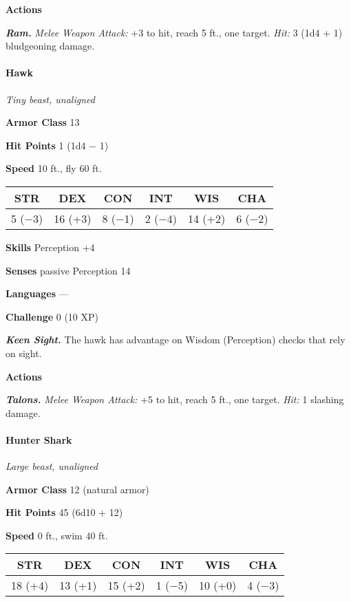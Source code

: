 \documentclass[
]{article}
\begin{document}
\textbf{Actions}

\emph{\textbf{Ram.}} \emph{Melee Weapon Attack:} +3 to hit, reach 5 ft.,
one target. \emph{Hit:} 3 (1d4 + 1) bludgeoning damage.

\hypertarget{hawk}{%
\paragraph{Hawk}\label{hawk}}

\emph{Tiny beast, unaligned}

\textbf{Armor Class} 13

\textbf{Hit Points} 1 (1d4 − 1)

\textbf{Speed} 10 ft., fly 60 ft.

\begin{longtable}[]{@{}cccccc@{}}
\toprule
STR & DEX & CON & INT & WIS & CHA\tabularnewline
\midrule
\endhead
5 (−3) & 16 (+3) & 8 (−1) & 2 (−4) & 14 (+2) & 6 (−2)\tabularnewline
\bottomrule
\end{longtable}

\textbf{Skills} Perception +4

\textbf{Senses} passive Perception 14

\textbf{Languages} ---

\textbf{Challenge} 0 (10 XP)

\emph{\textbf{Keen Sight.}} The hawk has advantage on Wisdom
(Perception) checks that rely on sight.

\textbf{Actions}

\emph{\textbf{Talons.}} \emph{Melee Weapon Attack:} +5 to hit, reach 5
ft., one target. \emph{Hit:} 1 slashing damage.

\hypertarget{hunter-shark}{%
\paragraph{Hunter Shark}\label{hunter-shark}}

\emph{Large beast, unaligned}

\textbf{Armor Class} 12 (natural armor)

\textbf{Hit Points} 45 (6d10 + 12)

\textbf{Speed} 0 ft., swim 40 ft.

\begin{longtable}[]{@{}cccccc@{}}
\toprule
STR & DEX & CON & INT & WIS & CHA\tabularnewline
\midrule
\endhead
18 (+4) & 13 (+1) & 15 (+2) & 1 (−5) & 10 (+0) & 4 (−3)\tabularnewline
\bottomrule
\end{longtable}
\end{document}
